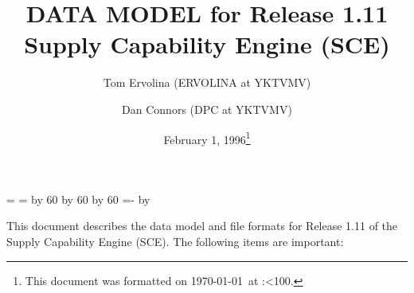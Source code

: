 \topmargin 0.0in
\headheight 0.0in
\headsep 0.0in
\textwidth 7.5in
\oddsidemargin -0.5in
\textheight 9in
\newcount\hh
\newcount\mm

\mm=\time
\hh=\time
\divide\hh by 60
\divide\mm by 60
\multiply\mm by 60
\mm=-\mm
\advance\mm by \time
\def\hhmm{\number\hh:\ifnum\mm<10{}0\fi\number\mm}


\title{DATA MODEL for Release 1.11  Supply Capability Engine (SCE)}
\author{Tom Ervolina (ERVOLINA at YKTVMV) \and Dan Connors  (DPC at YKTVMV)}
\date{February 1, 1996\footnote[2]{This document was 
formatted on \today\ at \hhmm.}}
\maketitle
This document describes the data model and file formats 
for Release 1.11 of the Supply Capability 
Engine (SCE).  The following items are important:

